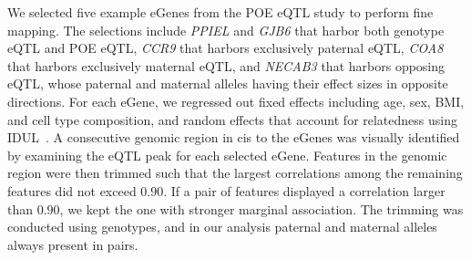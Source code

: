 \documentclass[12pt,Times]{article}
\def\cite{\citep}
\begin{document}
We selected five example eGenes from the POE eQTL study to perform fine mapping.  The selections include \emph{PPIEL} and \emph{GJB6} that harbor both genotype eQTL and POE eQTL,  \emph{CCR9} that harbors exclusively paternal eQTL, \emph{COA8} that harbors exclusively maternal eQTL, and \emph{NECAB3} that harbors opposing eQTL, whose paternal and maternal alleles having their effect sizes in opposite directions.  For each eGene,  we regressed out  fixed effects including age, sex, BMI, and cell type composition, and random effects that account for relatedness using IDUL~\cite{idul}.  A consecutive genomic region in cis to the eGenes was visually identified by examining the eQTL peak for each selected eGene. Features in the genomic region were then trimmed such that the largest correlations among the remaining features did not exceed $0.90$.  If a pair of features displayed a correlation larger than $0.90$, we kept the one with stronger marginal association.  The trimming was conducted using genotypes, and in our analysis paternal and maternal alleles always present in pairs. 
\end{document}
